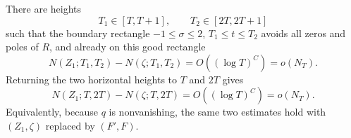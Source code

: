 \begin{proposition}
\label{prop:z1-zeta-decrement}
There are heights
\[
T_1\in[T,T+1],\qquad T_2\in[2T,2T+1]
\]
such that the boundary rectangle $-1\le\sigma\le2$, $T_1\le t\le T_2$
avoids all zeros and poles of $R$, and already on this good rectangle
\begin{equation}
\boxed{
N(Z_1;T_1,T_2)-N(\zeta;T_1,T_2)
=O((\log T)^C)=o(N_T).
}
\label{eq:z1-zeta-good-decrement}
\end{equation}
Returning the two horizontal heights to $T$ and $2T$ gives
\begin{equation}
\boxed{
N(Z_1;T,2T)-N(\zeta;T,2T)
=O((\log T)^C)=o(N_T).
}
\label{eq:z1-zeta-decrement}
\end{equation}
Equivalently, because $q$ is nonvanishing, the same two estimates hold with
$(Z_1,\zeta)$ replaced by $(F',F)$.
\end{proposition}

